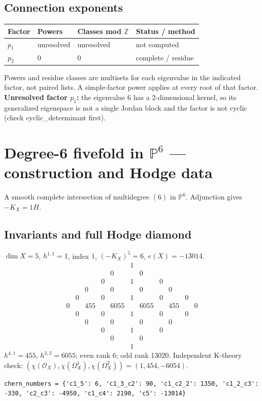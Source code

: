 \documentclass[10pt,a4paper]{article}
\begin{document}
\subsection*{Connection exponents}
\begin{center}\begin{tabular}{llll}\toprule Factor & Powers & Classes mod $\mathbb Z$ & Status / method\\\midrule
$p_{1}$ & unresolved & unresolved & not computed\\
$p_{2}$ & $0$ & $0$ & complete / residue\\
\bottomrule\end{tabular}\end{center}
Powers and residue classes are multisets for each eigenvalue in the indicated factor, not paired lists. A simple-factor power applies at every root of that factor.
\textbf{Unresolved factor $p_{1}$:} the eigenvalue 6 has a 2-dimensional kernel, so its generalized eigenspace is not a single Jordan block and the factor is not cyclic (check cyclic\_determinant first).
\clearpage\section*{Degree-6 fivefold in $\mathbb P^{6}$ --- construction and Hodge data}\label{entry:PCI5-6}
A smooth complete intersection of multidegree $(6)$ in $\mathbb P^{6}$.
Adjunction gives $-K_X=1H$.
\subsection*{Invariants and full Hodge diamond}
$\dim X=5$, $h^{1,1}=1$, index $1$, $(-K_X)^5=6$, $e(X)=-13014$.
\[\begin{array}{ccccccccccc}&&&&&1&&&&&\\&&&&0&&0&&&&\\&&&0&&1&&0&&&\\&&0&&0&&0&&0&&\\&0&&0&&1&&0&&0&\\0&&455&&6055&&6055&&455&&0\\&0&&0&&1&&0&&0&\\&&0&&0&&0&&0&&\\&&&0&&1&&0&&&\\&&&&0&&0&&&&\\&&&&&1&&&&&\end{array}\]
$h^{4,1}=455$, $h^{3,2}=6055$; even rank 6; odd rank 13020.
Independent K-theory check: $(\chi(\mathcal O_X),\chi(\Omega_X^1),\chi(\Omega_X^2))=(1, 454, -6054)$.
\begin{lstlisting}
chern_numbers = {'c1_5': 6, 'c1_3_c2': 90, 'c1_c2_2': 1350, 'c1_2_c3': -330, 'c2_c3': -4950, 'c1_c4': 2190, 'c5': -13014}
\end{lstlisting}
\end{document}
